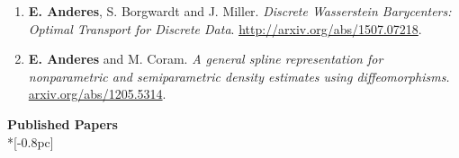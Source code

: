 \documentclass[11pt]{article}
\newcommand{\head}[1]{
  \vspace{10pt}
  {\Large \bf #1} \\*[-0.8pc]
  \underline{\hspace{6.07in}}}
\begin{document}
\vspace{.1mm}


\begin{enumerate}[labelindent=0pt]


\item
{\bf E. Anderes}, S. Borgwardt and J. Miller. \textsl{Discrete Wasserstein Barycenters: Optimal Transport for Discrete Data}.
\url{http://arxiv.org/abs/1507.07218}.



\item
{\bf E. Anderes} and M. Coram.  \textsl{A general spline representation for nonparametric and semiparametric density estimates using diffeomorphisms.}  \url{arxiv.org/abs/1205.5314}.

\end{enumerate}



\newpage


\head{Published Papers}%

 \vspace{.1mm}
\end{document}
